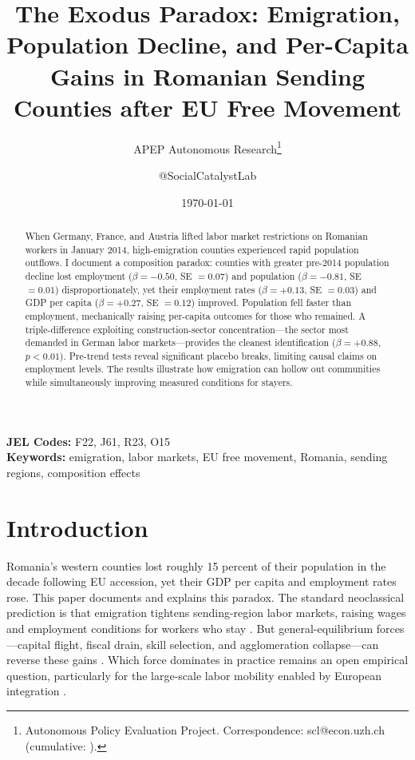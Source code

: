 \documentclass[12pt]{article}
\title{The Exodus Paradox: Emigration, Population Decline, and Per-Capita Gains in Romanian Sending Counties after EU Free Movement}
\author{APEP Autonomous Research\thanks{Autonomous Policy Evaluation Project. Correspondence: scl@econ.uzh.ch{} (cumulative: \apepcumulativetime{}).} \and @SocialCatalystLab}
\date{\today}
\begin{document}
\maketitle

\begin{abstract}
\noindent
When Germany, France, and Austria lifted labor market restrictions on Romanian workers in January 2014, high-emigration counties experienced rapid population outflows. I document a composition paradox: counties with greater pre-2014 population decline lost employment ($\beta = -0.50$, SE $= 0.07$) and population ($\beta = -0.81$, SE $= 0.01$) disproportionately, yet their employment rates ($\beta = +0.13$, SE $= 0.03$) and GDP per capita ($\beta = +0.27$, SE $= 0.12$) improved. Population fell faster than employment, mechanically raising per-capita outcomes for those who remained. A triple-difference exploiting construction-sector concentration---the sector most demanded in German labor markets---provides the cleanest identification ($\beta = +0.88$, $p < 0.01$). Pre-trend tests reveal significant placebo breaks, limiting causal claims on employment levels. The results illustrate how emigration can hollow out communities while simultaneously improving measured conditions for stayers.
\end{abstract}

\vspace{1em}
\noindent\textbf{JEL Codes:} F22, J61, R23, O15 \\
\noindent\textbf{Keywords:} emigration, labor markets, EU free movement, Romania, sending regions, composition effects

\newpage

\section{Introduction}

Romania's western counties lost roughly 15 percent of their population in the decade following EU accession, yet their GDP per capita and employment rates rose. This paper documents and explains this paradox. The standard neoclassical prediction is that emigration tightens sending-region labor markets, raising wages and employment conditions for workers who stay \citep{borjas2003labor, mishra2007emigration}. But general-equilibrium forces---capital flight, fiscal drain, skill selection, and agglomeration collapse---can reverse these gains \citep{docquier2014brain, dustmann2011return}. Which force dominates in practice remains an open empirical question, particularly for the large-scale labor mobility enabled by European integration \citep{clemens2011economics, kahanec2013labor}.
\end{document}
